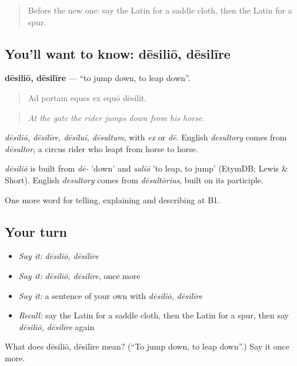 \begin{quote}
Before the new one: say the Latin for a saddle cloth, then the Latin for a spur.
\end{quote}

\subsection*{You'll want to know: dēsiliō, dēsilīre}
\textbf{dēsiliō, dēsilīre} — \textquotedblleft{}to jump down, to leap down\textquotedblright{}.

\begin{quote}
Ad portam eques ex equō dēsilit.
\end{quote}

\begin{quote}
\emph{At the gate the rider jumps down from his horse.}
\end{quote}

\emph{dēsiliō, dēsilīre, dēsiluī, dēsultum}, with \emph{ex} or \emph{dē}. English \emph{desultory} comes from \emph{dēsultor}, a circus rider who leapt from horse to horse.

\begin{cousinweb}
\emph{dēsiliō} is built from \emph{dē-} 'down' and \emph{saliō} 'to leap, to jump' (EtymDB; Lewis \& Short). English \emph{desultory} comes from \emph{dēsultōrius}, built on its participle.
\end{cousinweb}

\begin{grammarlens}[title={What you've built}]
One more word for telling, explaining and describing at B1.
\end{grammarlens}

\subsection*{Your turn}
\begin{itemize}
\raggedright
  \item \emph{Say it:} \emph{dēsiliō, dēsilīre}
  \item \emph{Say it:} \emph{dēsiliō, dēsilīre}, once more
  \item \emph{Say it:} a sentence of your own with \emph{dēsiliō, dēsilīre}
  \item \emph{Recall:} say the Latin for a saddle cloth, then the Latin for a spur, then say \emph{dēsiliō, dēsilīre} again
\end{itemize}

\begin{tcolorbox}[breakable,colback=teal!4,colframe=teal!35!black,title={Before you move on}]
What does dēsiliō, dēsilīre mean? (\textquotedblleft{}To jump down, to leap down\textquotedblright{}.) Say it once more.
\end{tcolorbox}
